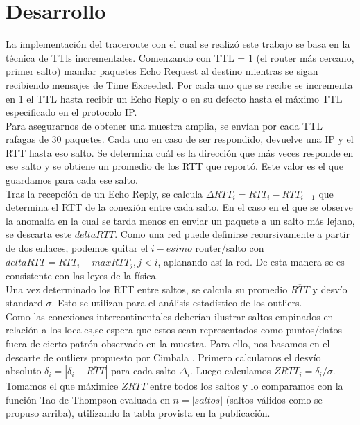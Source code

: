 \section{Desarrollo}

La implementación del traceroute con el cual se realizó este trabajo se basa en la técnica de TTls incrementales. Comenzando con TTL = 1 (el router más cercano, primer salto) mandar paquetes Echo Request al destino mientras se sigan recibiendo mensajes de Time Exceeded. Por cada uno que se recibe se incrementa en 1 el TTL hasta recibir un Echo Reply o en su defecto hasta el máximo TTL especificado en el protocolo IP. \\
Para asegurarnos de obtener una muestra amplia, se envían por cada TTL rafagas de 30 paquetes. Cada uno en caso de ser respondido, devuelve una IP y el RTT hasta eso salto. Se determina cuál es la dirección que más veces responde en ese salto y se obtiene un promedio de los RTT que reportó. Este valor es el que guardamos para cada ese salto.\\

Tras la recepción de un Echo Reply, se calcula 
$\Delta RTT_{i}=RTT_{i}-RTT_{i-1}$ que determina el RTT de 
la conexión entre cada salto. En el caso en el que se 
observe la anomalía en la cual se tarda menos en enviar un 
paquete a un salto más lejano, se descarta este 
$deltaRTT$. Como una red puede definirse recursivamente a 
partir de dos enlaces, podemos quitar el $i-esimo$ 
router/salto con $deltaRTT = RTT_{i}-max{RTT_{j}}, j < i$, 
aplanando así la red. De esta manera se es consistente con 
las leyes de la física.\\

Una vez determinado los RTT entre saltos, se calcula su promedio $\overline{RTT}$ y desvío standard $\sigma$. Esto se utilizan para el análisis estadístico de los outliers.\\

Como las conexiones intercontinentales deberían ilustrar saltos empinados en relación a los locales,se espera que estos sean representados como puntos/datos fuera de cierto patrón observado en la muestra.
Para ello, nos basamos en el descarte de outliers propuesto por Cimbala \cite{Cimbala}. 
Primero calculamos el desvío absoluto $\delta_{i}=|\delta_{i}-\overline{RTT}|$ para cada salto   $\Delta_{i}$.
Luego calculamos $ZRTT_{i}=\delta_{i}/\sigma$. Tomamos el que máximice $ZRTT$ entre todos los saltos y lo comparamos con la función Tao de Thompson evaluada en $n = |saltos|$ (saltos válidos como se propuso arriba), utilizando la tabla provista en la publicación.\\

